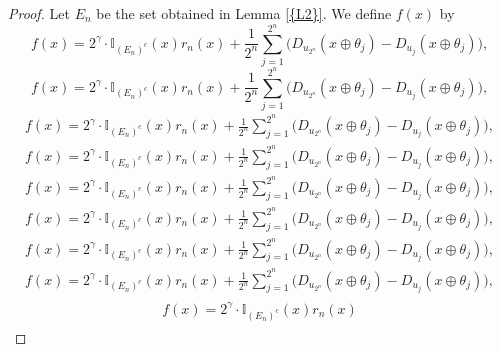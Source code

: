 \documentclass{amsart}
\numberwithin{equation}{section}
\begin{document}
\begin{proof}
{}
Let $E_n$ be the set obtained in {Lemma \ref{{L2}}}. We define $f(x)$ by
{
\begin{equation*} \label{a11}
f(x)=2^{\gamma}\cdot {\ensuremath{\mathbb I}}_{(E_n)^c}(x)r_n(x)
+\frac{1}{2^{n}}\sum_{j=1}^{2^n}\bigg(D_{u_{2^n}}(x\oplus\theta_j)-D_{u_j}(x\oplus\theta_j)\bigg),
 \end{equation*}\fi  
{}\begin{equation}\label{a11}
f(x)=2^{\gamma}\cdot {\ensuremath{\mathbb I}}_{(E_n)^c}(x)r_n(x)
+\frac{1}{2^{n}}\sum_{j=1}^{2^n}\bigg(D_{u_{2^n}}(x\oplus\theta_j)-D_{u_j}(x\oplus\theta_j)\bigg),
\end{equation}\fi   
{}\begin{align*}\label{a11}
f(x)=2^{\gamma}\cdot {\ensuremath{\mathbb I}}_{(E_n)^c}(x)r_n(x)
+\frac{1}{2^{n}}\sum_{j=1}^{2^n}\bigg(D_{u_{2^n}}(x\oplus\theta_j)-D_{u_j}(x\oplus\theta_j)\bigg),
\end{align*}\fi   
{}\begin{align}\label{a11}
f(x)=2^{\gamma}\cdot {\ensuremath{\mathbb I}}_{(E_n)^c}(x)r_n(x)
+\frac{1}{2^{n}}\sum_{j=1}^{2^n}\bigg(D_{u_{2^n}}(x\oplus\theta_j)-D_{u_j}(x\oplus\theta_j)\bigg),
\end{align}\fi    
{}\begin{gather*}\label{a11}
f(x)=2^{\gamma}\cdot {\ensuremath{\mathbb I}}_{(E_n)^c}(x)r_n(x)
+\frac{1}{2^{n}}\sum_{j=1}^{2^n}\bigg(D_{u_{2^n}}(x\oplus\theta_j)-D_{u_j}(x\oplus\theta_j)\bigg),
\end{gather*}\fi  
{}\begin{gather}\label{a11}
f(x)=2^{\gamma}\cdot {\ensuremath{\mathbb I}}_{(E_n)^c}(x)r_n(x)
+\frac{1}{2^{n}}\sum_{j=1}^{2^n}\bigg(D_{u_{2^n}}(x\oplus\theta_j)-D_{u_j}(x\oplus\theta_j)\bigg),
\end{gather}\fi   
{}\begin{multline*}\label{a11}
f(x)=2^{\gamma}\cdot {\ensuremath{\mathbb I}}_{(E_n)^c}(x)r_n(x)
+\frac{1}{2^{n}}\sum_{j=1}^{2^n}\bigg(D_{u_{2^n}}(x\oplus\theta_j)-D_{u_j}(x\oplus\theta_j)\bigg),
\end{multline*}\fi  
{}\begin{multline}\label{a11}
f(x)=2^{\gamma}\cdot {\ensuremath{\mathbb I}}_{(E_n)^c}(x)r_n(x)
+\frac{1}{2^{n}}\sum_{j=1}^{2^n}\bigg(D_{u_{2^n}}(x\oplus\theta_j)-D_{u_j}(x\oplus\theta_j)\bigg),
\end{multline}\fi  
{}\begin{multline*}\begin{split}\label{a11}
f(x)=2^{\gamma}\cdot {\ensuremath{\mathbb I}}_{(E_n)^c}(x)r_n(x)

\end{split}
\end{multline*}}
\end{proof}
\end{document}
